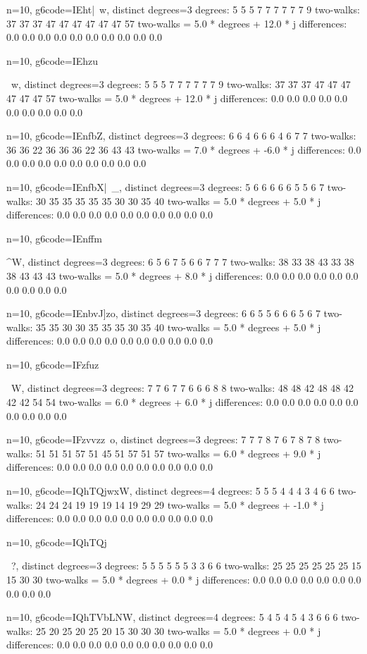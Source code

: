 {{{{{{{{{{{{{{{{n=10, g6code=IEh}t|}~w, distinct degrees=3
degrees: 5 5 5 7 7 7 7 7 7 9 
two-walks: 37 37 37 47 47 47 47 47 47 57 
two-walks = 5.0 * degrees + 12.0 * j
differences: 0.0 0.0 0.0 0.0 0.0 0.0 0.0 0.0 0.0 0.0 

n=10, g6code=IEhzu}}~w, distinct degrees=3
degrees: 5 5 5 7 7 7 7 7 7 9 
two-walks: 37 37 37 47 47 47 47 47 47 57 
two-walks = 5.0 * degrees + 12.0 * j
differences: 0.0 0.0 0.0 0.0 0.0 0.0 0.0 0.0 0.0 0.0 

n=10, g6code=IEnfbZ\vW, distinct degrees=3
degrees: 6 6 4 6 6 6 4 6 7 7 
two-walks: 36 36 22 36 36 36 22 36 43 43 
two-walks = 7.0 * degrees + -6.0 * j
differences: 0.0 0.0 0.0 0.0 0.0 0.0 0.0 0.0 0.0 0.0 

n=10, g6code=IEnfbX|~_, distinct degrees=3
degrees: 5 6 6 6 6 6 5 5 6 7 
two-walks: 30 35 35 35 35 35 30 30 35 40 
two-walks = 5.0 * degrees + 5.0 * j
differences: 0.0 0.0 0.0 0.0 0.0 0.0 0.0 0.0 0.0 0.0 

n=10, g6code=IEnffm}^W, distinct degrees=3
degrees: 6 5 6 7 5 6 6 7 7 7 
two-walks: 38 33 38 43 33 38 38 43 43 43 
two-walks = 5.0 * degrees + 8.0 * j
differences: 0.0 0.0 0.0 0.0 0.0 0.0 0.0 0.0 0.0 0.0 

n=10, g6code=IEnbvJ]zo, distinct degrees=3
degrees: 6 6 5 5 6 6 6 5 6 7 
two-walks: 35 35 30 30 35 35 35 30 35 40 
two-walks = 5.0 * degrees + 5.0 * j
differences: 0.0 0.0 0.0 0.0 0.0 0.0 0.0 0.0 0.0 0.0 

n=10, g6code=IFzfuz}~W, distinct degrees=3
degrees: 7 7 6 7 7 6 6 6 8 8 
two-walks: 48 48 42 48 48 42 42 42 54 54 
two-walks = 6.0 * degrees + 6.0 * j
differences: 0.0 0.0 0.0 0.0 0.0 0.0 0.0 0.0 0.0 0.0 

n=10, g6code=IFzvvzz~o, distinct degrees=3
degrees: 7 7 7 8 7 6 7 8 7 8 
two-walks: 51 51 51 57 51 45 51 57 51 57 
two-walks = 6.0 * degrees + 9.0 * j
differences: 0.0 0.0 0.0 0.0 0.0 0.0 0.0 0.0 0.0 0.0 

n=10, g6code=IQhTQjwxW, distinct degrees=4
degrees: 5 5 5 4 4 4 3 4 6 6 
two-walks: 24 24 24 19 19 19 14 19 29 29 
two-walks = 5.0 * degrees + -1.0 * j
differences: 0.0 0.0 0.0 0.0 0.0 0.0 0.0 0.0 0.0 0.0 

n=10, g6code=IQhTQj{~?, distinct degrees=3
degrees: 5 5 5 5 5 5 3 3 6 6 
two-walks: 25 25 25 25 25 25 15 15 30 30 
two-walks = 5.0 * degrees + 0.0 * j
differences: 0.0 0.0 0.0 0.0 0.0 0.0 0.0 0.0 0.0 0.0 

n=10, g6code=IQhTVbLNW, distinct degrees=4
degrees: 5 4 5 4 5 4 3 6 6 6 
two-walks: 25 20 25 20 25 20 15 30 30 30 
two-walks = 5.0 * degrees + 0.0 * j
differences: 0.0 0.0 0.0 0.0 0.0 0.0 0.0 0.0 0.0 0.0 

}}}}}}}}}}}
